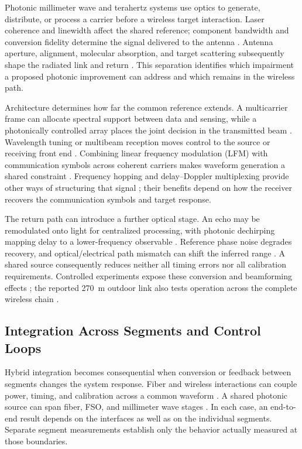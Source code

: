Photonic millimeter wave and terahertz systems use optics to generate,
distribute, or process a carrier before a wireless target interaction. Laser
coherence and linewidth affect the shared reference; component bandwidth and
conversion fidelity determine the signal delivered to the antenna
\cite{OISAC_SCR00988,OISAC_SCR01004}. Antenna aperture, alignment, molecular
absorption, and target scattering subsequently shape the radiated link and
return \cite{OISAC_SCR00989,OISAC_SCR00992}. This separation identifies which
impairment a proposed photonic improvement can address and which remains in the
wireless path.

Architecture determines how far the common reference extends. A multicarrier
frame can allocate spectral support between data and sensing, while a
photonically controlled array places the joint decision in the transmitted
beam \cite{OISAC_SCR01054,OISAC_SCR00036}. Wavelength tuning or multibeam
reception moves control to the source or receiving front end
\cite{OISAC_SCR00185,OISAC_SCR00396}. Combining linear frequency modulation
(LFM) with communication symbols across coherent carriers makes waveform
generation a shared constraint \cite{OISAC_SCR00988}. Frequency hopping and
delay--Doppler multiplexing provide other ways of structuring that signal
\cite{OISAC_SCR00992,OISAC_SCR00973}; their benefits depend on how the receiver
recovers the communication symbols and target response.

The return path can introduce a further optical stage. An echo may be
remodulated onto light for centralized processing, with photonic dechirping
mapping delay to a lower-frequency observable
\cite{OISAC_SCR00966,OISAC_SCR01000}. Reference phase noise degrades recovery,
and optical/electrical path mismatch can shift the inferred range
\cite{OISAC_SCR00966}. A shared source consequently reduces neither all timing
errors nor all calibration requirements. Controlled experiments expose these
conversion and beamforming effects
\cite{OISAC_SCR00988,OISAC_SCR00036}; the reported 270~m outdoor link also
tests operation across the complete wireless chain \cite{OISAC_SCR01054}.

\subsection{Integration Across Segments and Control Loops}

Hybrid integration becomes consequential when conversion or feedback between
segments changes the system response. Fiber and wireless interactions can
couple power, timing, and calibration across a common waveform
\cite{OISAC_SCR00210,OISAC_SCR00366}. A shared photonic source can span fiber,
FSO, and millimeter wave stages \cite{OISAC_SCR00944}. In each case, an
end-to-end result depends on the interfaces as well as on the individual
segments. Separate segment measurements establish only the behavior actually
measured at those boundaries.

